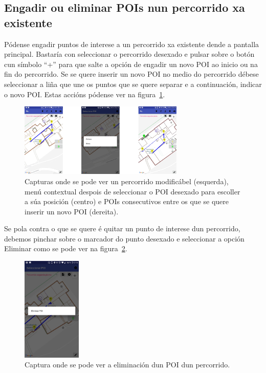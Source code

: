 \subsection{Engadir ou eliminar POIs nun percorrido xa existente}
Pódense engadir puntos de interese a un percorrido xa existente dende a pantalla principal. Bastaría con seleccionar o percorrido desexado e pulsar sobre o botón cun símbolo ``+'' para que salte a opción de engadir un novo POI ao inicio ou na fin do percorrido. Se se quere inserir un novo POI no medio do percorrido débese seleccionar a liña que une os puntos que se quere separar e a continuación, indicar o novo POI. Estas accións pódense ver na figura~\ref{fig:mapaEngadirPoiPercorrido}.

\begin{figure}[H]
	\begin{center}
		\includegraphics[width=0.7\textwidth]{figures/android/mapaEngadirPoiPercorrido}
		\caption{Capturas onde se pode ver un percorrido modificábel (esquerda), menú contextual despois de seleccionar o POI desexado para escoller a súa posición (centro) e POIs consecutivos entre os que se quere inserir un novo POI (dereita).}
		\label{fig:mapaEngadirPoiPercorrido}
	\end{center}
\end{figure}

Se pola contra o que se quere é quitar un punto de interese dun percorrido, debemos pinchar sobre o marcador do punto desexado e seleccionar a opción Eliminar como se pode ver na figura~\ref{fig:mapaEliminarPoiPercorrido}.

\begin{figure}[h]
	\begin{center}
		\includegraphics[width=0.25\textwidth]{figures/android/mapaEliminarPoiPercorrido}
		\caption{Captura onde se pode ver a eliminación dun POI dun percorrido.}
		\label{fig:mapaEliminarPoiPercorrido}
	\end{center}
\end{figure}


